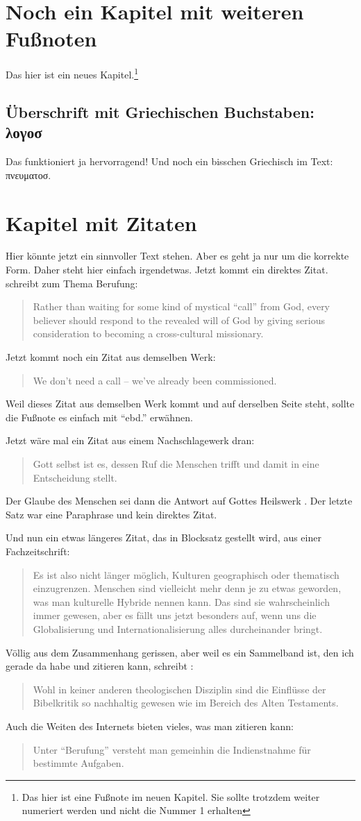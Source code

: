 \documentclass{scrreport}
\begin{document}
\chapter{Noch ein Kapitel mit weiteren Fußnoten}
Das hier ist ein neues Kapitel.\footnote{Das hier ist eine Fußnote im neuen Kapitel. Sie sollte trotzdem weiter numeriert werden und nicht die Nummer 1 erhalten}

\section{Überschrift mit Griechischen Buchstaben: λογοσ}
Das funktioniert ja hervorragend! Und noch ein bisschen Griechisch im Text: πνευματοσ.

\chapter{Kapitel mit Zitaten}
Hier könnte jetzt ein sinnvoller Text stehen. Aber es geht ja nur um die korrekte Form. Daher steht hier einfach irgendetwas. Jetzt kommt ein direktes Zitat. \citeauthor*{friesen} schreibt zum Thema Berufung: \blockcquote[][330]{friesen}{Rather than waiting for some kind of mystical \enquote{call} from God, every believer should respond to the revealed will of God by giving serious consideration to becoming a cross-cultural missionary.} Jetzt kommt noch ein Zitat aus demselben Werk: \blockcquote[][330]{friesen}{We don't need a call -- we've already been commissioned.} Weil dieses Zitat aus demselben Werk kommt und auf derselben Seite steht, sollte die Fußnote es einfach mit \enquote{ebd.} erwähnen.

Jetzt wäre mal ein Zitat aus einem Nachschlagewerk dran: \blockcquote[][80]{rienecker}{Gott selbst ist es, dessen Ruf die Menschen trifft und damit in eine Entscheidung stellt.} Der Glaube des Menschen sei dann die Antwort auf Gottes Heilswerk \autocite[Vgl.][]{rienecker}. Der letzte Satz war eine Paraphrase und kein direktes Zitat.

Und nun ein etwas längeres Zitat, das in Blocksatz gestellt wird, aus einer Fachzeitschrift: \blockcquote[][]{dahl}{Es ist also nicht länger möglich, Kulturen geographisch oder thematisch einzugrenzen. Menschen sind vielleicht mehr denn je zu etwas geworden, was man kulturelle Hybride nennen kann. Das sind sie wahrscheinlich immer gewesen, aber es fällt uns jetzt besonders auf, wenn uns die Globalisierung und Internationalisierung alles durch\-einander bringt.}

Völlig aus dem Zusammenhang gerissen, aber weil es ein Sammelband ist, den ich gerade da habe und zitieren kann, schreibt \citeauthor*{hilbrands}: \blockcquote[][49]{hilbrands}{Wohl in keiner anderen theologischen Disziplin sind die Einflüsse der Bibelkritik so nachhaltig gewesen wie im Bereich des Alten Testaments.}

Auch die Weiten des Internets bieten vieles, was man zitieren kann: \blockcquote[][]{strecker}{Unter \enquote{Berufung} versteht man gemeinhin die \textelp{} Indienstnahme für bestimmte Aufgaben.}

\newpage
\printbibliography[title=Literaturverzeichnis]

\newpage
\printindex

\newpage
\statementofauthorship
\end{document}
